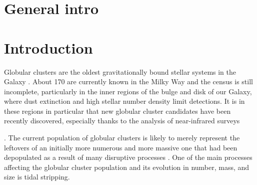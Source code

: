 \section{General intro}

\section{Introduction}
Globular clusters are the oldest gravitationally bound stellar systems in the Galaxy \citep{1997A&ARv...8....1M}. About 170 are currently known in the Milky Way \citep{2021MNRAS.505.5978V} and the census is still incomplete, particularly in the inner regions of the bulge and disk of our Galaxy, where  dust extinction and  high stellar number density limit detections. It is in these regions in particular that new globular cluster candidates have been recently discovered, especially thanks to the analysis of near-infrared surveys  

\citep{2011A&A...527A..81M,2011A&A...535A..33M,2017ApJ...838L..14M,2017ApJ...849L..24M,2018ApJ...866...12M,2019A&A...628A..45G,2020A&A...642L..19G,2022A&A...659A.155G,2022A&A...658A.120G,2021A&A...649A..86G,2021A&A...650L..11M,2021A&A...652A.129M,2022MNRAS.509.4962G}.  The current population of globular clusters  is likely to merely represent the leftovers of an initially more numerous and more massive one that had been depopulated as a result of many disruptive processes \citep{1997ApJ...474..223G, 1997MNRAS.288..749M, 1997MNRAS.291..717M, 1997MNRAS.289..898V, 2001ApJ...561..751F}. One of the main processes affecting the globular cluster population and its evolution in number, mass, and size is tidal stripping.   

